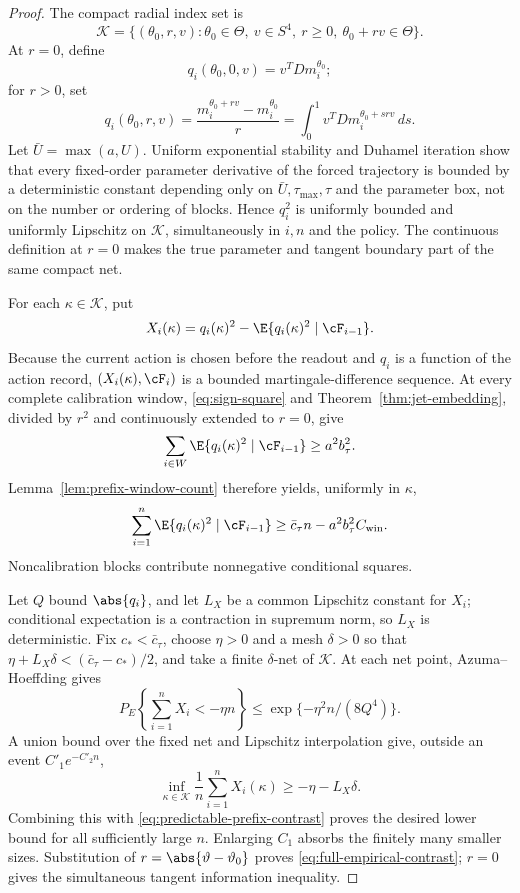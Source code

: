 \begin{proof}
The compact radial index set is
\[
 \mathscr K=\{(\theta_0,r,v):\theta_0\in\Theta,\ v\in S^4,\ r\ge0,
 \ \theta_0+rv\in\Theta\}.
\]
At \(r=0\), define
\[
 q_i(\theta_0,0,v)=v^TDm_i^{\theta_0};
\]
for \(r>0\), set
\[
 q_i(\theta_0,r,v)=
 \frac{m_i^{\theta_0+rv}-m_i^{\theta_0}}r
 =\int_0^1v^TDm_i^{\theta_0+srv}\,ds.
\]
Let \(\bar U=\max(a,U)\).  Uniform exponential stability and Duhamel
iteration show that every fixed-order parameter derivative of the forced
trajectory is bounded by a deterministic constant depending only on
\(\bar U,\tau_{\max},\tau\) and the parameter box, not on the number or
ordering of blocks.  Hence \(q_i^2\) is uniformly bounded and uniformly
Lipschitz on \(\mathscr K\), simultaneously in \(i,n\) and the policy.
The continuous definition at \(r=0\) makes the true parameter and tangent
boundary part of the same compact net.

For each \(\kappa\in\mathscr K\), put
\[
 X_i(\kappa)=q_i(\kappa)^2-
 \E\{q_i(\kappa)^2\mid\cF_{i-1}\}.
\]
Because the current action is chosen before the readout and \(q_i\) is a
function of the action record, \((X_i(\kappa),\cF_i)\) is a bounded
martingale-difference sequence.  At every complete calibration window,
\eqref{eq:sign-square} and Theorem~\ref{thm:jet-embedding}, divided by
\(r^2\) and continuously extended to \(r=0\), give
\[
 \sum_{i\in W}\E\{q_i(\kappa)^2\mid\cF_{i-1}\}
 \ge a^2b_\tau^2.
\]
Lemma~\ref{lem:prefix-window-count} therefore yields, uniformly in
\(\kappa\),
\begin{equation}
 \sum_{i=1}^n\E\{q_i(\kappa)^2\mid\cF_{i-1}\}
 \ge \bar c_\tau n-a^2b_\tau^2C_{\rm win}.
 \label{eq:predictable-prefix-contrast}
\end{equation}
Noncalibration blocks contribute nonnegative conditional squares.

Let \(Q\) bound \(\abs{q_i}\), and let \(L_X\) be a common Lipschitz
constant for \(X_i\); conditional expectation is a contraction in supremum
norm, so \(L_X\) is deterministic.  Fix \(c_*<\bar c_\tau\), choose
\(\eta>0\) and a mesh \(\delta>0\) so that
\(\eta+L_X\delta<(\bar c_\tau-c_*)/2\), and take a finite
\(\delta\)-net of \(\mathscr K\).  At each net point, Azuma--Hoeffding gives
\[
 P_E\left\{\sum_{i=1}^nX_i<-\eta n\right\}
 \le \exp\{-\eta^2n/(8Q^4)\}.
\]
A union bound over the fixed net and Lipschitz interpolation give, outside an
event \(C'_1e^{-C'_2n}\),
\[
 \inf_{\kappa\in\mathscr K}\frac1n\sum_{i=1}^nX_i(\kappa)
 \ge-\eta-L_X\delta.
\]
Combining this with \eqref{eq:predictable-prefix-contrast} proves the desired
lower bound for all sufficiently large \(n\).  Enlarging \(C_1\) absorbs the
finitely many smaller sizes.  Substitution of
\(r=\abs{\vartheta-\vartheta_0}\) proves
\eqref{eq:full-empirical-contrast}; \(r=0\) gives the simultaneous tangent
information inequality.
\end{proof}

